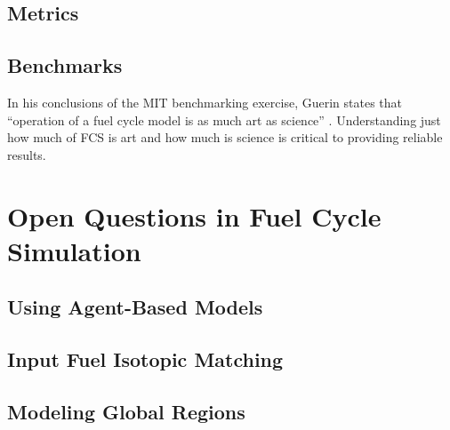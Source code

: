 \subsection{Metrics}
%

\subsection{Benchmarks}
%

In his conclusions of the MIT benchmarking exercise, Guerin states that
``operation of a fuel cycle model is as much art as science''
\cite{guerin_benchmark_2009}. Understanding just how much of FCS is art and how
much is science is critical to providing reliable results. 

\section{Open Questions in Fuel Cycle Simulation}

\subsection{Using Agent-Based Models}

\subsection{Input Fuel Isotopic Matching}

\subsection{Modeling Global Regions}
